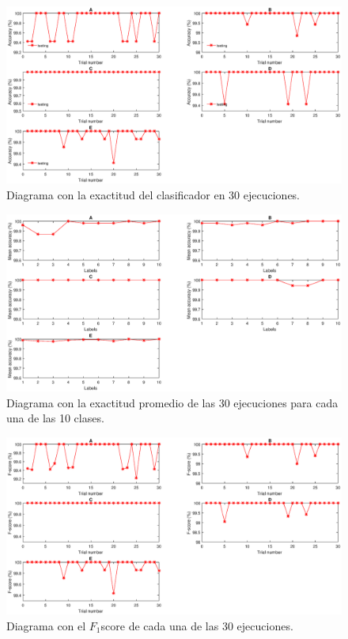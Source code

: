 \documentclass[12pt]{article}%
\begin{document}
\begin{figure}[ht]
  \centering
    \includegraphics[scale=0.5]{./AccG.eps}
  \caption{Diagrama con la exactitud del clasificador en 30 ejecuciones.}
  \label{fig:AccG}
\end{figure}

\begin{figure}[ht]
  \centering
    \includegraphics[scale=0.5]{./Acc.eps}
  \caption{Diagrama con la exactitud promedio de las 30 ejecuciones para cada una de las 10 clases.}
  \label{fig:Acc}
\end{figure}

\begin{figure}[ht]
  \centering
    \includegraphics[scale=0.5]{./FscG.eps}
  \caption{Diagrama con el $F_{1}$score de cada una de las 30 ejecuciones.}
  \label{fig:FscG}
\end{figure}
\end{document}
